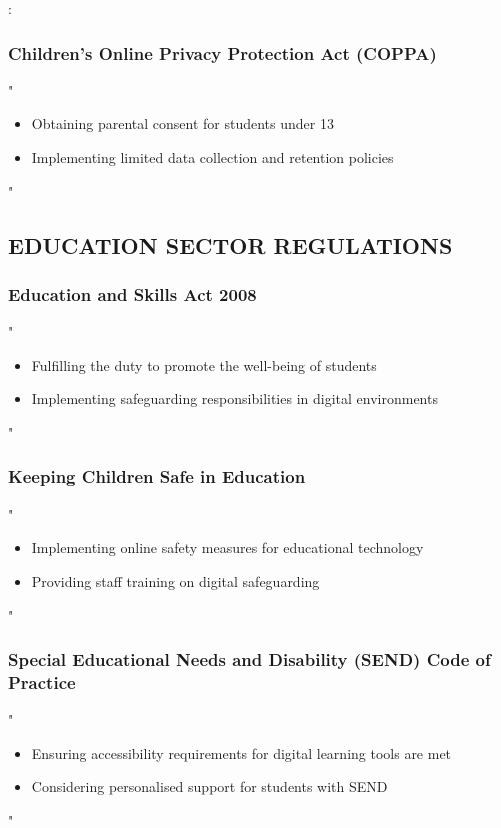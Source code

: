 \documentclass[14pt,a4paper]{article}
\begin{document}
\textit{\parencite{UKGov2018}}:

\subsubsection*{Children's Online Privacy Protection Act (COPPA)}
"
\begin{itemize}
    \item Obtaining parental consent for students under 13
    \item Implementing limited data collection and retention policies
\end{itemize}
"


\textit{\parencite{FTC2024}}

\subsection*{EDUCATION SECTOR REGULATIONS}

\subsubsection*{Education and Skills Act 2008}
"
\begin{itemize}
    \item Fulfilling the duty to promote the well-being of students
    \item Implementing safeguarding responsibilities in digital environments
\end{itemize}
"

\textit{\parencite{UKGov2008}}


\subsubsection*{Keeping Children Safe in Education}
"
\begin{itemize}
    \item Implementing online safety measures for educational technology
    \item Providing staff training on digital safeguarding
\end{itemize}
"

\textit{\parencite{DfE2024a}}

\subsubsection*{Special Educational Needs and Disability (SEND) Code of Practice}
"
\begin{itemize}
    \item Ensuring accessibility requirements for digital learning tools are met
    \item Considering personalised support for students with SEND
\end{itemize}
"
\end{document}
